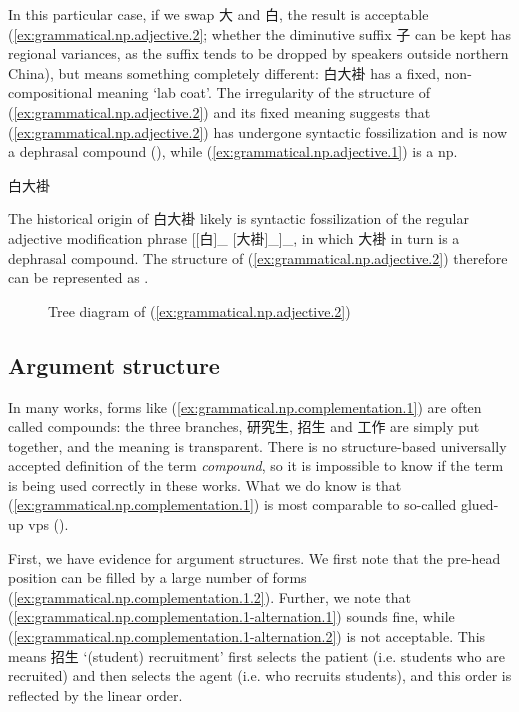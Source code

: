 \documentclass[UTF8, a4paper, oneside, scheme=plain, 12pt]{ctexrep}
\newcommand*{\term}[1]{\emph{#1}}
\newcommand{\translate}[1]{`#1'}
\begin{document}
In this particular case, 
if we swap 大 and 白, the result is acceptable (\ref{ex:grammatical.np.adjective.2};
whether the diminutive suffix 子 can be kept has regional variances,
as the suffix tends to be dropped by speakers outside northern China),
but means something completely different:
白大褂 has a fixed, non-compositional meaning \translate{lab coat}.
The irregularity of the structure of (\ref{ex:grammatical.np.adjective.2})
and its fixed meaning suggests that (\ref{ex:grammatical.np.adjective.2}) has undergone syntactic fossilization
and is now a dephrasal compound (),
while (\ref{ex:grammatical.np.adjective.1}) is a \ac{np}.

\begin{exe}
    \ex\label{ex:grammatical.np.adjective.2} 白大褂
\end{exe}

The historical origin of 白大褂 likely is syntactic fossilization
of the regular adjective modification phrase [[白]_{} [大褂]_{}]_{},
in which 大褂 in turn is a dephrasal compound.
The structure of (\ref{ex:grammatical.np.adjective.2})
therefore can be represented as .

\begin{figure}[H]
    \centering
    {
        \centering
        
    }
    \caption{Tree diagram of (\ref{ex:grammatical.np.adjective.2})}
    \label{fig:grammatical.np.adjective.2}
\end{figure}

\subsection{Argument structure}\label{sec:grammatical.np.complementation}

In many works, forms like (\ref{ex:grammatical.np.complementation.1}) are often called compounds:
the three branches, 研究生, 招生 and 工作 are simply put together,
and the meaning is transparent.
There is no structure-based universally accepted definition of the term \term{compound},
so it is impossible to know if the term is being used correctly in these works.
What we do know is that (\ref{ex:grammatical.np.complementation.1})
is most comparable to so-called glued-up \acp{vp} ().

First, we have evidence for argument structures. 
We first note that the pre-head position can be filled by a large number of forms
(\ref{ex:grammatical.np.complementation.1.2}).
Further, we note that (\ref{ex:grammatical.np.complementation.1-alternation.1}) sounds fine,
while (\ref{ex:grammatical.np.complementation.1-alternation.2}) is not acceptable.
This means 招生 \translate{(student) recruitment} first selects the patient
(i.e. students who are recruited)
and then selects the agent (i.e. who recruits students),
and this order is reflected by the linear order.
\end{document}
